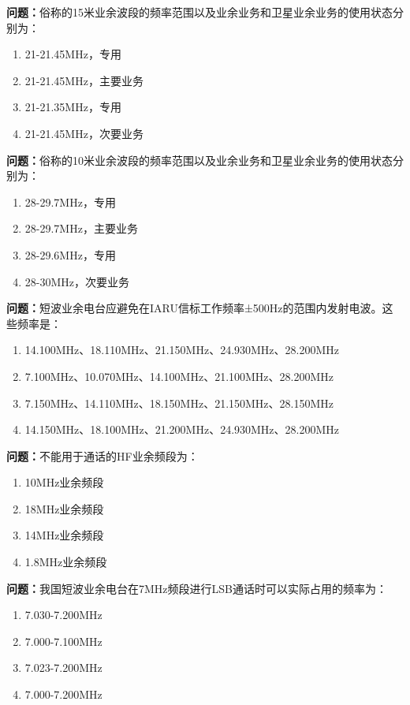 \noindent\textbf{问题：}俗称的15米业余波段的频率范围以及业余业务和卫星业余业务的使用状态分别为：
\begin{enumerate}[label=\Alph*), leftmargin=3em]
\item 21-21.45MHz，专用
\item 21-21.45MHz，主要业务
\item 21-21.35MHz，专用
\item 21-21.45MHz，次要业务
\end{enumerate}

\bigskip


\noindent\textbf{问题：}俗称的10米业余波段的频率范围以及业余业务和卫星业余业务的使用状态分别为：
\begin{enumerate}[label=\Alph*), leftmargin=3em]
\item 28-29.7MHz，专用
\item 28-29.7MHz，主要业务
\item 28-29.6MHz，专用
\item 28-30MHz，次要业务
\end{enumerate}

\bigskip


\noindent\textbf{问题：}短波业余电台应避免在IARU信标工作频率±500Hz的范围内发射电波。这些频率是：
\begin{enumerate}[label=\Alph*), leftmargin=3em]
\item 14.100MHz、18.110MHz、21.150MHz、24.930MHz、28.200MHz
\item 7.100MHz、10.070MHz、14.100MHz、21.100MHz、28.200MHz
\item 7.150MHz、14.110MHz、18.150MHz、21.150MHz、28.150MHz
\item 14.150MHz、18.100MHz、21.200MHz、24.930MHz、28.200MHz
\end{enumerate}

\bigskip


\noindent\textbf{问题：}不能用于通话的HF业余频段为：
\begin{enumerate}[label=\Alph*), leftmargin=3em]
\item 10MHz业余频段
\item 18MHz业余频段
\item 14MHz业余频段
\item 1.8MHz业余频段
\end{enumerate}

\bigskip


\noindent\textbf{问题：}我国短波业余电台在7MHz频段进行LSB通话时可以实际占用的频率为：
\begin{enumerate}[label=\Alph*), leftmargin=3em]
\item 7.030-7.200MHz
\item 7.000-7.100MHz
\item 7.023-7.200MHz
\item 7.000-7.200MHz
\end{enumerate}

